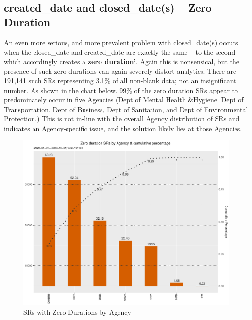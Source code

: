 \documentclass[12pt, titlepage]{article}
\begin{document}
\subsection{created\_date and closed\_date(s) --  Zero Duration}
\label{sec: zeroduration}		
	An even more serious, and more prevalent problem with closed\_date(s) 
	occurs when the closed\_date and created\_date are exactly the same -- to 
	the second -- which accordingly creates a \textbf{zero duration'}. Again 
	this is nonsensical, but the presence of such zero durations can again 
	severely distort analytics. There are 191,141 such SRs representing 3.1\% of 
	all non-blank data; not an insignificant number. As shown in the chart 
	below, 99\% of the zero duration SRs appear to predominately occur in five 
	Agencies (Dept of Mental Health \&Hygiene, Dept of Transportation, 
	Dept of Business, Dept of Sanitation, and Dept of Environmental Protection.) 
	This is not in-line with the overall Agency distribution of SRs and indicates an 
	Agency-specific issue, and the solution likely lies at those Agencies.
	
	\begin{figure}[tbp]
		 \centering
		 \includegraphics[width = \textwidth]{zero_duration_SR.pdf}
		 \caption{SRs with Zero Durations by Agency}
		 \label{fig:zero-duration}
	\end{figure}	
		
\end{document}
